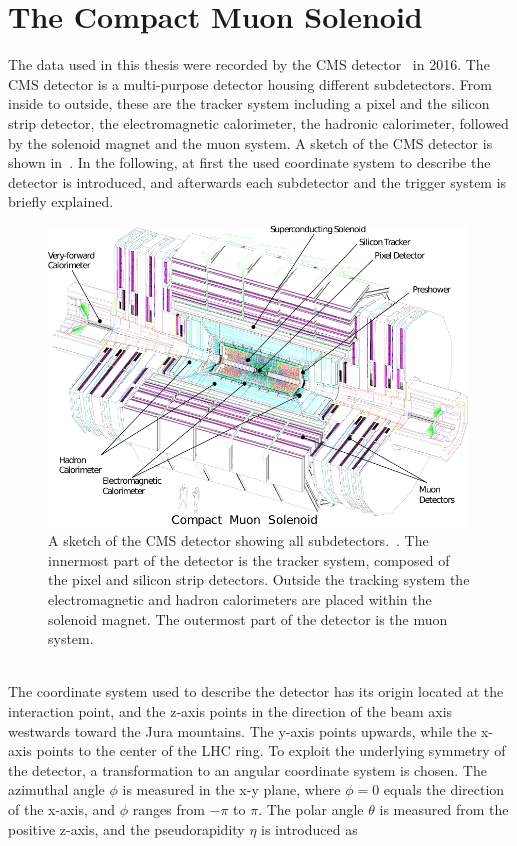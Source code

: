 \section{The Compact Muon Solenoid}\label{sec:CMS}
The data used in this thesis were recorded by the CMS detector~\cite{CMS,CMSTDR} in 2016. The CMS detector is a multi-purpose detector housing different subdetectors. From inside to outside, these are the tracker system including a pixel and the silicon strip detector, the electromagnetic calorimeter, the hadronic calorimeter, followed by the solenoid magnet and the muon system. A sketch of the CMS detector is shown in~. In the following, at first the used coordinate system to describe the detector is introduced, and afterwards each subdetector and the trigger system is briefly explained.
\begin{figure}[bp]
 \vspace{\baselineskip}
 \vspace{\baselineskip}
 \centering
 \includegraphics[width=0.99\textwidth]{figures/general/cms}
 \caption{A sketch of the CMS detector showing all subdetectors.~\cite{CMSTDR}. The innermost part of the detector is the tracker system, composed of the pixel and silicon strip detectors. Outside the tracking system the electromagnetic and hadron calorimeters are placed within the solenoid magnet. The outermost part of the detector is the muon system.}
 \label{fig:CMS}
\end{figure}
\\The coordinate system used to describe the detector has its origin located at the interaction point, and the z-axis points in the direction of the beam axis westwards toward the Jura mountains. The y-axis points upwards, while the x-axis points to the center of the LHC ring. To exploit the underlying symmetry of the detector, a transformation to an angular coordinate system is chosen. The azimuthal angle $\phi$ is measured in the x-y plane, where $\phi=0$ equals the direction of the x-axis, and $\phi$ ranges from $-\pi$ to $\pi$. The polar angle $\theta$ is measured from the positive z-axis, and the pseudorapidity $\eta$ is introduced as
